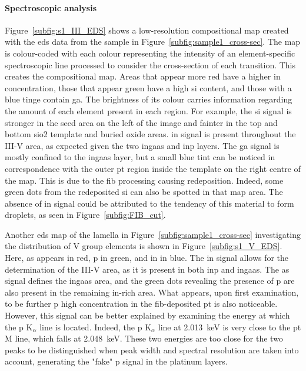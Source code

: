 \paragraph{Spectroscopic analysis}Figure~\ref{subfig:s1_III_EDS} shows a low-resolution compositional map created with the \acf{eds} data from the sample in Figure~\ref{subfig:sample1_cross-sec}. The map is colour-coded with each colour representing the intensity of an element-specific spectroscopic line processed to consider the cross-section of each transition. This creates the compositional map. Areas that appear more red have a higher \acl{in} concentration, those that appear green have a high \acl{si} content, and those with a blue tinge contain \acl{ga}. The brightness of its colour carries information regarding the amount of each element present in each region. For example, the \acl{si} signal is stronger in the seed area on the left of the image and fainter in the top and bottom \acs{sio2} template and buried oxide areas. \Acl{in} signal is present throughout the III-V area, as expected given the two \acs{ingaas} and \acs{inp} layers. The \acl{ga} signal is mostly confined to the \acs{ingaas} layer, but a small blue tint can be noticed in correspondence with the outer \acl{pt} region inside the template on the right centre of the map. This is due to the \acs{fib} processing causing redeposition. Indeed, some green dots from the redeposited \acl{si} can also be spotted in that map area. The absence of \acl{in} signal could be attributed to the tendency of this material to form droplets, as seen in Figure~\ref{subfig:FIB_cut}.
\par
Another \acs{eds} map of the lamella in Figure~\ref{subfig:sample1_cross-sec} investigating the distribution of V group elements is shown in Figure~\ref{subfig:s1_V_EDS}. Here, \acl{as} appears in red, \acl{p} in green, and \acl{in} in blue. The \acl{in} signal allows for the determination of the III-V area, as it is present in both \acs{inp} and \acs{ingaas}. The \acl{as} signal defines the \acs{ingaas} area, and the green dots revealing the presence of \acl{p} are also present in the remaining \acs{in}-rich area. What appears, upon first examination, to be further \acl{p} high concentration in the \acs{fib}-deposited \acl{pt} is also noticeable. However, this signal can be better explained by examining the energy at which the \acl{p} K\(_\alpha\) line is located. Indeed, the \acs{p} K\(_\alpha\) line at \qty{2.013}{\kilo\eV} is very close to the \acl{pt} M line, which falls at \qty{2.048}{\kilo\eV}. These two energies are too close for the two peaks to be distinguished when peak width and spectral resolution are taken into account, generating the "fake" \acl{p} signal in the platinum layers.
\par
